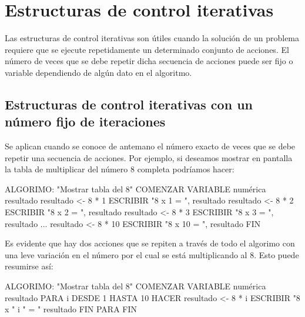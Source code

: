 \documentclass[
]{book}
\newenvironment{Shaded}{\begin{snugshade}}{\end{snugshade}}
\newcommand{\NormalTok}[1]{#1}
\begin{document}
\hypertarget{estructuras-de-control-iterativas}{%
\section{Estructuras de control iterativas}\label{estructuras-de-control-iterativas}}

Las estructuras de control iterativas son útiles cuando la solución de un problema requiere que se ejecute repetidamente un determinado conjunto de acciones. El número de veces que se debe repetir dicha secuencia de acciones puede ser fijo o variable dependiendo de algún dato en el algoritmo.

\hypertarget{estructuras-de-control-iterativas-con-un-nuxfamero-fijo-de-iteraciones}{%
\subsection{Estructuras de control iterativas con un número fijo de iteraciones}\label{estructuras-de-control-iterativas-con-un-nuxfamero-fijo-de-iteraciones}}

Se aplican cuando se conoce de antemano el número exacto de veces que se debe repetir una secuencia de acciones. Por ejemplo, si deseamos mostrar en pantalla la tabla de multiplicar del número 8 completa podríamos hacer:

\begin{Shaded}
\begin{Highlighting}[]
\NormalTok{ALGORIMO: "Mostrar tabla del 8"}
\NormalTok{COMENZAR}
\NormalTok{    VARIABLE numérica resultado}
\NormalTok{    resultado \textless{}{-} 8 * 1}
\NormalTok{    ESCRIBIR "8 x 1 = ", resultado}
\NormalTok{    resultado \textless{}{-} 8 * 2}
\NormalTok{    ESCRIBIR "8 x 2 = ", resultado}
\NormalTok{    resultado \textless{}{-} 8 * 3}
\NormalTok{    ESCRIBIR "8 x 3 = ", resultado}
\NormalTok{    ...}
\NormalTok{    resultado \textless{}{-} 8 * 10}
\NormalTok{    ESCRIBIR "8 x 10 = ", resultado}
\NormalTok{FIN}
\end{Highlighting}
\end{Shaded}

Es evidente que hay dos acciones que se repiten a través de todo el algorimo con una leve variación en el número por el cual se está multiplicando al 8. Esto puede resumirse así:

\begin{Shaded}
\begin{Highlighting}[]
\NormalTok{ALGORIMO: "Mostrar tabla del 8"}
\NormalTok{COMENZAR}
\NormalTok{    VARIABLE numérica resultado}
\NormalTok{    PARA i DESDE 1 HASTA 10 HACER}
\NormalTok{        resultado \textless{}{-} 8 * i}
\NormalTok{        ESCRIBIR "8 x " i " = " resultado}
\NormalTok{    FIN PARA}
\NormalTok{FIN}
\end{Highlighting}
\end{Shaded}
\end{document}
